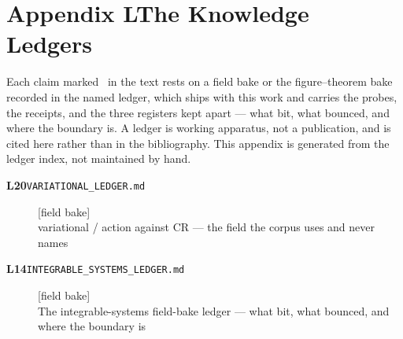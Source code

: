 \clearpage
\section*{Appendix L\quad The Knowledge Ledgers}\label{app:ledgers}
\small\noindent Each claim marked \ldgmarker\ in the text rests on a field bake or the figure--theorem bake recorded in the named ledger, which ships with this work and carries the probes, the receipts, and the three registers kept apart --- what bit, what bounced, and where the boundary is. A ledger is working apparatus, not a publication, and is cited here rather than in the bibliography. This appendix is generated from the ledger index, not maintained by hand.\par\medskip
\begingroup\renewcommand{\arraystretch}{1.25}
\begin{description}
\item[\textbf{L20}\quad\texttt{VARIATIONAL\_LEDGER.md}]\hfill\textsf{[field bake]}\\
variational / action against CR --- the field the corpus uses and never names
\item[\textbf{L14}\quad\texttt{INTEGRABLE\_SYSTEMS\_LEDGER.md}]\hfill\textsf{[field bake]}\\
The integrable-systems field-bake ledger --- what bit, what bounced, and where the boundary is
\end{description}
\endgroup

